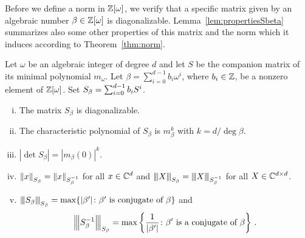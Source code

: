 Before we define a norm in $\mathbb{Z}[\omega]$, we verify that a specific matrix given by an algebraic number $\beta\in\mathbb{Z}[\omega]$ is diagonalizable. Lemma~\ref{lem:propertiesSbeta} summarizes also some other properties of this matrix and the norm which it induces according to Theorem~\ref{thm:norm}.
\begin{lem}
\label{lem:propertiesSbeta}
Let $\omega$ be an algebraic integer of degree $d$ and let $S$ be the companion matrix of its minimal polynomial $m_\omega$. Let $\beta=\sum_{i=0}^{d-1} b_i \omega^i$, where $b_i \in \mathbb{Z}$, be a nonzero element of $\mathbb{Z}[\omega]$. Set $S_\beta=\sum_{i=0}^{d-1} {b}_i S^i$.
\begin{enumerate}[i)]
   \item The matrix $S_\beta$ is diagonalizable.
   \item The characteristic polynomial of $S_\beta$ is $m_\beta^k$ with $k=d / \deg \beta$.
   \item $|\det S_\beta|=|m_\beta(0)|^k$.
   \item $\left\lVert x\right\rVert_{S_\beta}=\left\lVert x\right\rVert_{S_\beta^{-1}}$ for all $x \in \mathbb{C}^d$ and ${\left\vert\kern-0.25ex\left\vert\kern-0.25ex\left\vert X\right\vert\kern-0.25ex\right\vert\kern-0.25ex\right\vert}_{S_\beta}={\left\vert\kern-0.25ex\left\vert\kern-0.25ex\left\vert X\right\vert\kern-0.25ex\right\vert\kern-0.25ex\right\vert}_{S_\beta^{-1}}$ for all $X \in \mathbb{C}^{d\times d}$.
   \item ${\left\vert\kern-0.25ex\left\vert\kern-0.25ex\left\vert S_\beta\right\vert\kern-0.25ex\right\vert\kern-0.25ex\right\vert}_{S_\beta}=\max \{|\beta'| \colon \beta' \text{ is conjugate of } \beta\}$ and  $$ {\left\vert\kern-0.25ex\left\vert\kern-0.25ex\left\vert S_\beta^{-1}\right\vert\kern-0.25ex\right\vert\kern-0.25ex\right\vert}_{S_\beta}=\max \left\{\frac{1}{|\beta'|} \colon \beta' \text{ is a conjugate of } \beta\right\}\,.$$
\end{enumerate}  
\end{lem}
